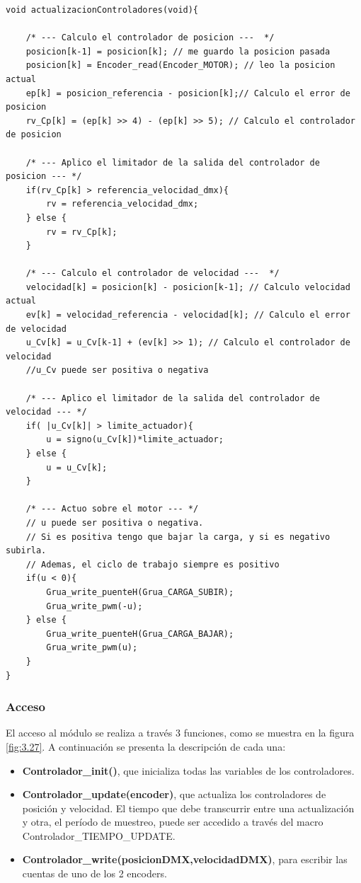 \begin{lstlisting}[style=CStyle]
void actualizacionControladores(void){

	/* --- Calculo el controlador de posicion ---  */
	posicion[k-1] = posicion[k]; // me guardo la posicion pasada
	posicion[k] = Encoder_read(Encoder_MOTOR); // leo la posicion actual
	ep[k] = posicion_referencia - posicion[k];// Calculo el error de posicion
	rv_Cp[k] = (ep[k] >> 4) - (ep[k] >> 5); // Calculo el controlador de posicion
	
	/* --- Aplico el limitador de la salida del controlador de posicion --- */
	if(rv_Cp[k] > referencia_velocidad_dmx){
		rv = referencia_velocidad_dmx;
	} else {
		rv = rv_Cp[k];
	}
	
	/* --- Calculo el controlador de velocidad ---  */
	velocidad[k] = posicion[k] - posicion[k-1]; // Calculo velocidad actual
	ev[k] = velocidad_referencia - velocidad[k]; // Calculo el error de velocidad
	u_Cv[k] = u_Cv[k-1] + (ev[k] >> 1); // Calculo el controlador de velocidad
	//u_Cv puede ser positiva o negativa
	
	/* --- Aplico el limitador de la salida del controlador de velocidad --- */
	if( |u_Cv[k]| > limite_actuador){
		u = signo(u_Cv[k])*limite_actuador;
	} else {
		u = u_Cv[k];
	}
	
	/* --- Actuo sobre el motor --- */
	// u puede ser positiva o negativa. 
	// Si es positiva tengo que bajar la carga, y si es negativo subirla.
	// Ademas, el ciclo de trabajo siempre es positivo
	if(u < 0){
		Grua_write_puenteH(Grua_CARGA_SUBIR);
		Grua_write_pwm(-u);
	} else {
		Grua_write_puenteH(Grua_CARGA_BAJAR);
		Grua_write_pwm(u);
	}
}
\end{lstlisting}

\subsubsection{Acceso}
El acceso al módulo se realiza a través 3 funciones, como se muestra en la figura \ref{fig:3.27}. A continuación se presenta la descripción de cada una:
\begin{itemize}
	\item \textbf{Controlador\_init()}, que inicializa todas las variables de los controladores.
	\item \textbf{Controlador\_update(encoder)}, que actualiza los controladores de posición y velocidad. El tiempo que debe transcurrir entre una actualización y otra, el período de muestreo, puede ser accedido a través del macro Controlador\_TIEMPO\_UPDATE.
	\item \textbf{Controlador\_write(posicionDMX,velocidadDMX)}, para escribir las cuentas de uno de los 2 encoders.
\end{itemize}

